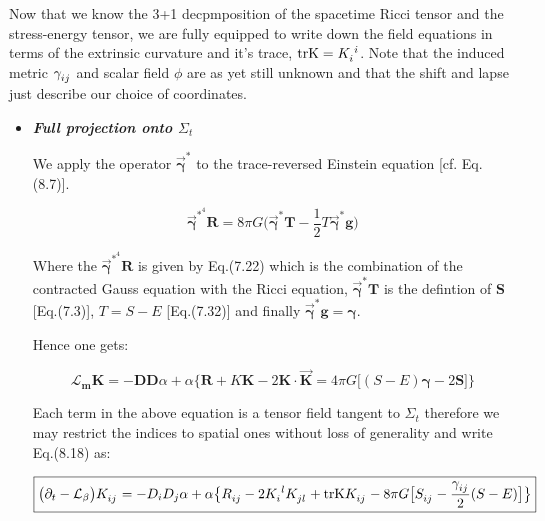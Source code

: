 \documentclass[12pt]{article}
\renewcommand{\vec}[1]{\bm{#1}}
\numberwithin{equation}{section}
\numberwithin{theorem}{subsection}
\begin{document}
Now that we know the 3+1 decpmposition of the spacetime Ricci tensor and the stress-energy tensor, we are fully equipped to write down the field equations in terms of the extrinsic curvature and it's trace, $\textrm{trK} = \tensor{K}{_i^i}$. \newline Note that the induced metric $\tensor{\gamma}{_i_j}$ and scalar field $\phi$ are as yet still unknown and that the shift and lapse just describe our choice of coordinates. 

\begin{itemize}

    \item \textit{\textbf{Full projection onto $\Sigma_{t}$}} \smallskip

    \newline We apply the operator $\overrightarrow{\vec{\gamma}}^{*}$ to the trace-reversed Einstein equation [cf. Eq.(8.7)].

    \begin{equation}

        \overrightarrow{\vec{\gamma}}^{*} ^{4}\vec{R} = 8 \pi G \Big(\overrightarrow{\vec{\gamma}}^{*}\vec{T} - \frac{1}{2}T \overrightarrow{\vec{\gamma}}^{*}\vec{g} \Big)

    \end{equation}

    Where the $\overrightarrow{\vec{\gamma}}^{*} ^{4}\vec{R}$ is given by Eq.(7.22) which is the combination of the contracted Gauss equation with the Ricci equation, $\overrightarrow{\vec{\gamma}}^{*}\vec{T}$ is the defintion of $\vec{S}$ [Eq.(7.3)], $T = S-E$ [Eq.(7.32)] and finally $\overrightarrow{\vec{\gamma}}^{*}\vec{g} = \vec{\gamma}$.

    Hence one gets:

    \begin{equation}

        \mathcal{L}_{\vec{m}}\vec{K} = -\vec{D}\vec{D}\alpha + \alpha\Big\{ \vec{R} + K\vec{K} - 2\vec{K} \cdot \overrightarrow{\vec{K}} = 4 \pi G \Big[(S-E)\vec{\gamma}- 2\vec{S} \Big]\Big\}

    \end{equation}

    Each term in the above equation is a tensor field tangent to $\Sigma_{t}$ therefore we may restrict the indices to spatial ones without loss of generality and write Eq.(8.18) as:

    \begin{align}

        \boxed{\big(\partial_{t} - \mathcal{L}_{\beta} \big)\tensor{K}{_i_j} = -D_{i}D_{j}\alpha + \alpha  \big\{ \tensor{R}{_i_j} - 2\tensor{K}{_i^l}\tensor{K}{_j_l} + \textrm{trK} \tensor{K}{_i_j} -8 \pi G \big[ \tensor{S}{_i_j} - \frac{\tensor{\gamma}{_i_j}}{2}(S-E) \big] \big\}}


\end{align}
\end{itemize}
\end{document}
